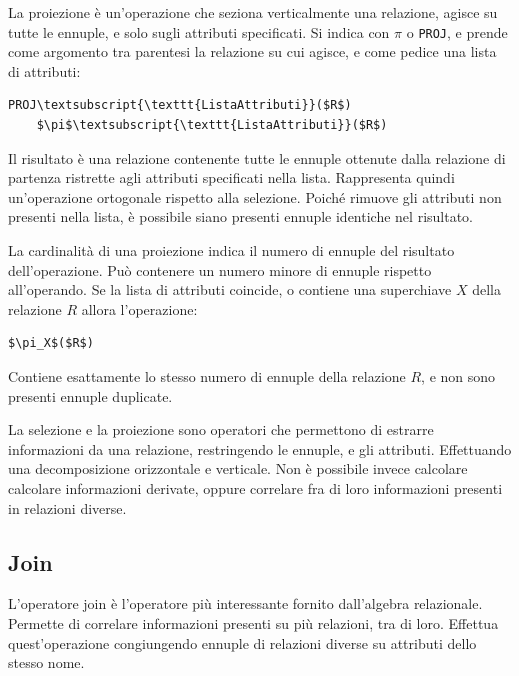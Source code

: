 \documentclass{article}
\numberwithin{equation}{subsection}
\begin{document}
La proiezione è un'operazione che seziona verticalmente una relazione, agisce su tutte le ennuple, e solo sugli attributi specificati. Si indica con $\pi$ o \verb|PROJ|, e prende come argomento tra parentesi la relazione 
su cui agisce, e come pedice una lista di attributi:
\begin{Verbatim}[commandchars=\\\{\}, codes={\catcode`$=3\catcode`_=8}]
    PROJ\textsubscript{\texttt{ListaAttributi}}($R$)
    $\pi$\textsubscript{\texttt{ListaAttributi}}($R$)
\end{Verbatim}
Il risultato è una relazione contenente tutte le ennuple ottenute dalla relazione di partenza ristrette agli attributi specificati nella lista. Rappresenta quindi un'operazione ortogonale rispetto 
alla selezione. Poiché rimuove gli attributi non presenti nella lista, è possibile siano presenti ennuple identiche nel risultato. 

La cardinalità di una proiezione indica il numero di ennuple del risultato dell'operazione. Può contenere un numero minore di ennuple rispetto all'operando. Se la lista di attributi coincide, o contiene una 
superchiave $X$ della relazione $R$ allora l'operazione:
\begin{Verbatim}[commandchars=\\\{\}, codes={\catcode`$=3\catcode`_=8}]
    $\pi_X$($R$)
\end{Verbatim}
Contiene esattamente lo stesso numero di ennuple della relazione $R$, e non sono presenti ennuple duplicate. 


La selezione e la proiezione sono operatori che permettono di estrarre informazioni da una relazione, restringendo le ennuple, e gli attributi. Effettuando una decomposizione orizzontale e verticale. 
Non è possibile invece calcolare calcolare informazioni derivate, oppure correlare fra di loro informazioni presenti in relazioni diverse. 

\subsection{Join}

L'operatore join è l'operatore più interessante fornito dall'algebra relazionale. Permette di correlare informazioni presenti su più relazioni, tra di loro. Effettua quest'operazione congiungendo 
ennuple di relazioni diverse su attributi dello stesso nome. 
\end{document}

